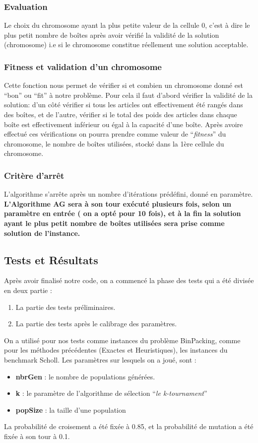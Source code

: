 \documentclass{article}
\begin{document}
\subsubsection{Evaluation}
Le choix du chromosome ayant la plus petite valeur de la cellule 0, c’est à dire le plus petit nombre de boîtes après avoir vérifié la validité de la solution (chromosome) i.e si le chromosome constitue réellement une solution acceptable.
\subsubsection{Fitness et validation d’un chromosome}
Cette fonction nous permet de vérifier si et combien un chromosome donné est “bon” ou “fit” à notre problème. 
\newline
Pour cela il faut d’abord vérifier la validité de la solution: d’un côté vérifier si tous les articles ont effectivement été rangés dans des boîtes, et de l’autre, vérifier si le total des poids des articles dans chaque boîte est effectivement inférieur ou égal à la capacité d’une boîte. 
\newline
Après avoire effectué ces vérifications on pourra prendre comme valeur de “\textit{fitness}” du chromosome, le nombre de boîtes utilisées, stocké dans la 1ère cellule du chromosome.
\subsubsection{Critère d'arrêt}
L'algorithme s’arrête après un nombre d’itérations prédéfini, donné en paramètre.
\newline
\newline
\textbf{L’Algorithme AG sera à son tour exécuté plusieurs fois, selon un paramètre en entrée  ( on a opté pour 10 fois), et à la fin la solution ayant le plus petit nombre de boîtes utilisées sera prise comme solution de l’instance.}
\subsection{Tests et Résultats}
Après avoir finalisé notre code, on a commencé la phase des tests qui a été divisée en deux partie :
\begin{enumerate}
	\item La partie des tests préliminaires.
	\item La partie des tests après le calibrage des paramètres. 
\end{enumerate}
On a utilisé pour nos tests comme instances du problème BinPacking, comme pour les méthodes précédentes (Exactes et Heuristiques), les instances du benchmark Scholl.
Les paramètres sur lesquels on a joué, sont :
\begin{itemize}
	\item \textbf{nbrGen} : le nombre de populations générées.
	\item\textbf{ k} : le paramètre de l’algorithme de sélection “\textit{le k-tournament}”
	\item \textbf{popSize} : la taille d’une population
\end{itemize}
La probabilité de croisement a été fixée  à 0.85, et la probabilité de mutation  a été fixée à son tour à 0.1.
\end{document}
